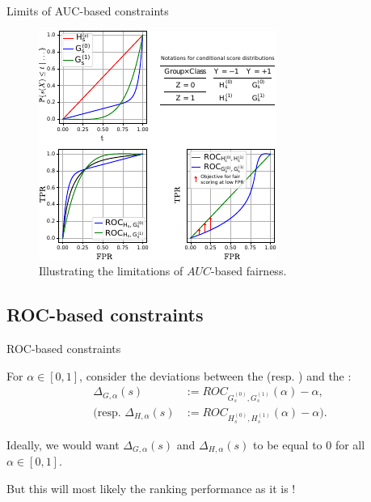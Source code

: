 \begin{frame}{Limits of AUC-based constraints}
    \begin{figure}[t]
        \centering
        \includegraphics[width=0.6\columnwidth, trim = 0cm 0cm 2.35cm 2.4cm, clip]{images/original_paper/example_simple_dists_explained_with_table2.pdf}
        \caption{Illustrating the limitations of $AUC$-based fairness.}
        \label{fig:example-1}
    \end{figure}
\end{frame}

\subsection{ROC-based constraints}
\begin{frame}{ROC-based constraints}

    For $\alpha \in [0,1]$, consider the deviations between the  (resp. )  and the :
    \begin{align*}
        \Delta_{G, \alpha}(s) &:= ROC_{G^{(0)}_s, G^{(1)}_s}(\alpha) - \alpha, \\
        \big( \text{resp. } \Delta_{H, \alpha}(s) & := ROC_{H^{(0)}_s,H^{(1)}_s}
        (\alpha) - \alpha
        \big).
    \end{align*}


    Ideally, we would want $\Delta_{G, \alpha}(s)$ and $\Delta_{H, \alpha}(s)$ to be equal to 0 for all $\alpha \in [0,1]$.

    But this will most likely  the ranking performance as it is  !
    
\end{frame}

